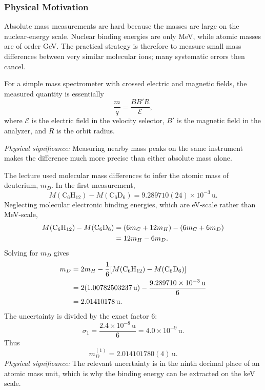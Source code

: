 \subsubsection*{Physical Motivation}
Absolute mass measurements are hard because the masses are large on the nuclear-energy scale.  Nuclear binding energies are only MeV, while atomic masses are of order GeV.  The practical strategy is therefore to measure small mass differences between very similar molecular ions; many systematic errors then cancel.

For a simple mass spectrometer with crossed electric and magnetic fields, the measured quantity is essentially
\begin{equation}\label{eq:lec03:mass_spectrometer_ratio}
  \boxed{
  \frac{m}{q}=\frac{B B' R}{\mathcal{E}},
  }
\end{equation}
where $\mathcal{E}$ is the electric field in the velocity selector, $B'$ is the magnetic field in the analyzer, and $R$ is the orbit radius.

\textit{Physical significance:} Measuring nearby mass peaks on the same instrument makes the difference much more precise than either absolute mass alone.

The lecture used molecular mass differences to infer the atomic mass of deuterium, $m_D$.  In the first measurement,
\[
  M(\mathrm{C}_6\mathrm{H}_{12})-M(\mathrm{C}_6\mathrm{D}_6)
  = 9.289710(24)\times10^{-3}\,\mathrm{u}.
\]
Neglecting molecular electronic binding energies, which are eV-scale rather than MeV-scale,
\begin{align*}
M(\mathrm{C}_6\mathrm{H}_{12})-M(\mathrm{C}_6\mathrm{D}_6)
&= \qty(6m_C+12m_H)-\qty(6m_C+6m_D)\\
&=12m_H-6m_D.
\end{align*}
Solving for $m_D$ gives
\begin{align*}
m_D
&=2m_H-\frac{1}{6}
\qty[M(\mathrm{C}_6\mathrm{H}_{12})-M(\mathrm{C}_6\mathrm{D}_6)]\\
&=2(1.00782503237\,\mathrm{u})
-\frac{9.289710\times10^{-3}\,\mathrm{u}}{6}\\
&=2.01410178\,\mathrm{u}.
\end{align*}
The uncertainty is divided by the exact factor $6$:
\[
  \sigma_1=\frac{2.4\times10^{-8}\,\mathrm{u}}{6}
  =4.0\times10^{-9}\,\mathrm{u}.
\]
Thus
\begin{equation}\label{eq:lec03:deuterium_mass_measurement_1}
  \boxed{
  m_D^{(1)}=2.014101780(4)\,\mathrm{u}.
  }
\end{equation}
\textit{Physical significance:} The relevant uncertainty is in the ninth decimal place of an atomic mass unit, which is why the binding energy can be extracted on the keV scale.

